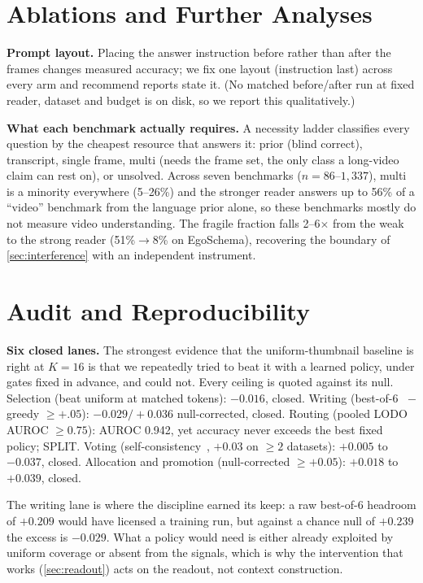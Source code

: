 \documentclass[10pt,twocolumn,letterpaper]{article}
\begin{document}
\section{Ablations and Further Analyses}
\label{sec:ablations}

\noindent\textbf{Prompt layout.} Placing the answer instruction before rather than after the frames changes measured accuracy; we fix one layout (instruction last) across every arm and recommend reports state it. (No matched before/after run at fixed reader, dataset and budget is on disk, so we report this qualitatively.)

\noindent\textbf{What each benchmark actually requires.} A necessity ladder classifies every question by the cheapest resource that answers it: prior (blind correct), transcript, single frame, multi (needs the frame set, the only class a long-video claim can rest on), or unsolved. Across seven benchmarks ($n{=}86$--$1{,}337$), multi is a minority everywhere (5--26\%) and the stronger reader answers up to 56\% of a ``video'' benchmark from the language prior alone, so these benchmarks mostly do not measure video understanding. The fragile fraction falls 2--6$\times$ from the weak to the strong reader (51\%$\rightarrow$8\% on EgoSchema), recovering the boundary of \cref{sec:interference} with an independent instrument.

\section{Audit and Reproducibility}
\label{sec:audit}

\noindent\textbf{Six closed lanes.} The strongest evidence that the uniform-thumbnail baseline is right at $K{=}16$ is that we repeatedly tried to beat it with a learned policy, under gates fixed in advance, and could not. Every ceiling is quoted against its null. Selection (beat uniform at matched tokens): $-0.016$, closed. Writing (best-of-6~\cite{chen2021codex} $-$ greedy $\ge +.05$): $-0.029/+0.036$ null-corrected, closed. Routing (pooled LODO AUROC $\ge 0.75$): AUROC 0.942, yet accuracy never exceeds the best fixed policy; SPLIT. Voting (self-consistency~\cite{wang2023selfconsistency}, $+0.03$ on $\ge2$ datasets): $+0.005$ to $-0.037$, closed. Allocation and promotion (null-corrected $\ge +0.05$): $+0.018$ to $+0.039$, closed.

The writing lane is where the discipline earned its keep: a raw best-of-6 headroom of $+0.209$ would have licensed a training run, but against a chance null of $+0.239$ the excess is $-0.029$. What a policy would need is either already exploited by uniform coverage or absent from the signals, which is why the intervention that works (\cref{sec:readout}) acts on the readout, not context construction.
\end{document}
